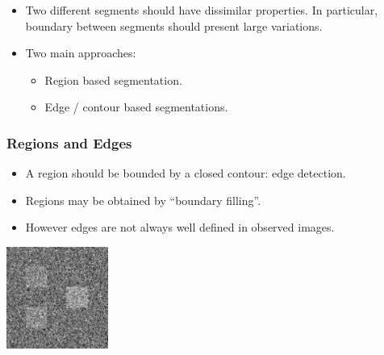 \documentclass[10pt]{beamer}
\begin{document}
\begin{frame}
 \begin{itemize}
  \item Two different segments should have dissimilar properties. In
    particular, boundary between segments should present large
    variations.\vfill
  \item Two main approaches: \vfill
    \begin{itemize}
    \item Region based segmentation. \vfill
    \item Edge / contour based segmentations.\vfill
    \end{itemize}
  \end{itemize}
\end{frame}




\begin{frame}
  \frametitle{Regions and Edges}
  \begin{itemize}
  \item A region should be bounded by a closed contour: edge
    detection.
  \item Regions may be obtained by ``boundary filling''.\vfill
  \item However edges are not always well defined in observed images. 
  \end{itemize}
  \begin{center}
    \includegraphics[width=0.25\textwidth]{IMAGES/noisy_squares}
  \end{center}
\end{frame}


\end{document}
